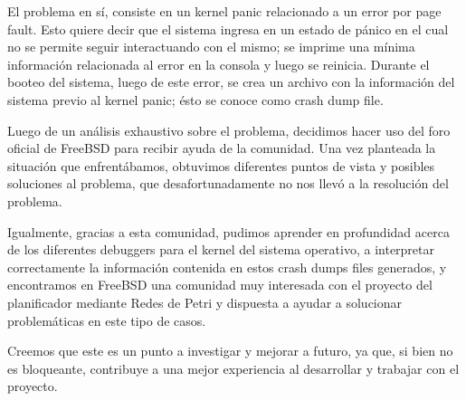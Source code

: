 El problema en sí, consiste en un kernel panic relacionado a un error por page fault. Esto quiere decir que el sistema ingresa en un estado de pánico en el cual no se permite seguir interactuando con el mismo; se imprime una mínima información relacionada al error en la consola y luego se reinicia. Durante el booteo del sistema, luego de este error, se crea un archivo con la información del sistema previo al kernel panic; ésto se conoce como crash dump file.

Luego de un análisis exhaustivo sobre el problema, decidimos hacer uso del foro oficial de FreeBSD para recibir ayuda de la comunidad. Una vez planteada la situación que enfrentábamos, obtuvimos diferentes puntos de vista y posibles soluciones al problema, que desafortunadamente no nos llevó a la resolución del problema.


Igualmente, gracias a esta comunidad, pudimos aprender en profundidad acerca de los diferentes debuggers para el kernel del sistema operativo, a interpretar correctamente la información contenida en estos crash dumps files generados, y encontramos en FreeBSD una comunidad muy interesada con el proyecto del planificador mediante Redes de Petri y dispuesta a ayudar a solucionar problemáticas en este tipo de casos.


Creemos que este es un punto a investigar y mejorar a futuro, ya que, si bien no es bloqueante, contribuye a una mejor experiencia al desarrollar y trabajar con el proyecto.
